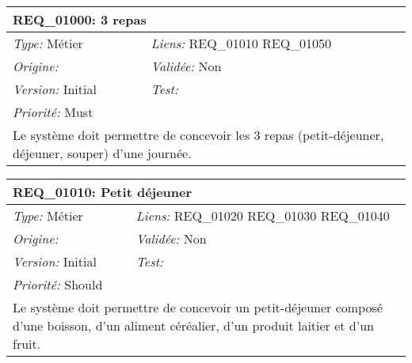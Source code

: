 
\begin{table}[!h]

\begin{tabular}{|p{60mm}p{100mm}|}

\hline

\multicolumn{2}{|l|}{\textbf{REQ\_01000:} 3 repas} \\ \hline

\emph{Type:} Métier & \emph{Liens:} REQ\_01010 REQ\_01050  \\

\emph{Origine:}  & \emph{Validée:} Non \\

\emph{Version:} Initial & \emph{Test:}  \\

\emph{Priorité:} Must & \\ \hline

\multicolumn{2}{|p{16cm}|}{Le système doit permettre de concevoir les 3 repas (petit-déjeuner, déjeuner, souper) d'une journée.} \\ \hline

\end{tabular}

\end{table}



\begin{table}[!h]

\begin{tabular}{|p{60mm}p{100mm}|}

\hline

\multicolumn{2}{|l|}{\textbf{REQ\_01010:} Petit déjeuner} \\ \hline

\emph{Type:} Métier & \emph{Liens:} REQ\_01020 REQ\_01030 REQ\_01040  \\

\emph{Origine:}  & \emph{Validée:} Non \\

\emph{Version:} Initial & \emph{Test:}  \\

\emph{Priorité:} Should & \\ \hline

\multicolumn{2}{|p{16cm}|}{Le système doit permettre de concevoir un petit-déjeuner composé d'une boisson, d'un aliment céréalier, d'un produit laitier et d'un fruit.} \\ \hline

\end{tabular}

\end{table}



